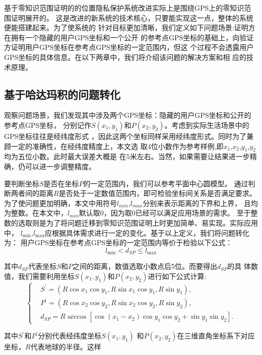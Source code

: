 \documentclass[zihao=-4]{ctexart}
\begin{document}
基于零知识范围证明的的位置隐私保护系统改进实际上是围绕GPS上的零知识范围证明展开的。
这是改进的新系统的技术核心，只要能实现这一点，整体的系统便能搭建起来。为了使系统的
针对目标更加清晰，我们定义如下问题场景:证明方在拥有一个隐藏的用户GPS坐标和一个公开
的参考点GPS坐标的基础上，向验证方证明用户GPS坐标在参考点GPS坐标的一定范围内，但这
个过程不会透露用户GPS坐标的具体信息。在以下两章中，我们将介绍该问题的解决方案和相
应的技术原理。
\subsection{基于哈达玛积的问题转化}
观察问题场景，我们发现其中涉及两个GPS坐标：隐藏的用户GPS坐标和公开的参考点GPS坐标，
分别记作$S(x_1,y_1)$和$P(x_2,y_2)$。考虑到实际生活场景中的GPS坐标往往是经纬度形式
，因此这两个坐标同样采用经纬度形式。同时为了兼顾一定的准确性，在经纬度精度上，本文选
取4位小数作为参考样例,即$x_1$,$x_2$,$y_1$,$y_2$均为五位小数。此时最大误差大概是
在$5$米左右。当然，如果需要让结果进一步精确，仍可以进一步调整精度。\par
要判断坐标$S$是否在坐标$P$的一定范围内，我们可以参考平面中心圆模型。
通过判断两者间的距离$R$是否处于一定数值范围内，即可检验坐标间关系是否满足要求。
为了使问题更加明确，本文中用符号$l_{min}$,$l_{max}$分别来表示距离的下界和上界，
且均为整数。在本文中，$l_{min}$默认取$0$，因为取$0$已经可以满足应用场景的需求。
至于整数的选取则是为了将问题迁移到零知识范围证明上时更加简单、易实现。实际应用中，
$l_{\min}$,$l_{\max}$应根据具体需求进行一定的变化。基于以上定义，我们将问题转化为：
用户GPS坐标在参考点GPS坐标的一定范围内等价于检验以下公式：
\begin{equation}l_{\min}< d_{SP}\leq l_{\max}\end{equation}\par
其中$d_{SP}$代表坐标$S$和$P$之间的距离，数值选取小数点后5位。而要得出$d_{SP}$的具
体数值，我们需要利用坐标$S(x_1,y_1)$和$P(x_2,y_2)$进行如下公式计算:
\begin{equation}
  \begin{cases}
    &S^{\prime}=(R\cos x_1\cos y_1,R\sin x_1\cos y_1,R\sin y_1),\\
    &P^{\prime}=(R\cos x_2\cos y_2,R\sin x_2\cos y_2,R\sin y_2),\\
    &d_{SP}=R\arccos[\cos(x_1-x_2)\cos y_1\cos y_2+\sin y_1\sin y_2].
  \end{cases}
\end{equation}\par
其中$S^{\prime}$和$P^{\prime}$分别代表经纬度坐标$S(x_1,y_1)$
和$P(x_2,y_2)$在三维直角坐标系下对应坐标，$R$代表地球的半径。这样
\end{document}
